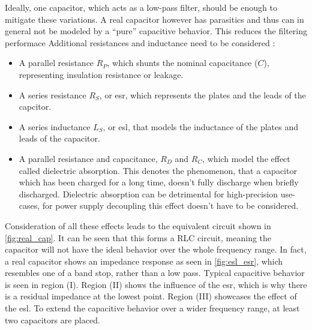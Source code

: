 Ideally, one capacitor, which acts as a low-pass filter, should be enough to mitigate these variations.
A real capacitor however has parasitics and thus can in general not be modeled by a ``pure'' capacitive behavior. This reduces the filtering performace  %
Additional resistances and inductance need to be considered \cite{decouple}:
\begin{itemize}
	\item A parallel resistance $R_P$, which shunts the nominal capacitance ($C$), representing insulation resistance or leakage.
	\item A series resistance $R_S$, or \gls{esr}, which represents the plates and the leads of the capcitor.
	\item A series inductance $L_S$, or \gls{esl}, that models the inductance of the plates and leads of the capacitor.
	\item A parallel resistance and capacitance, $R_D$ and $R_C$, which model the effect called dielectric absorption. This denotes the phenomenon, that a capacitor which has been charged for a long time, doesn't fully discharge when briefly discharged. Dielectric absorption can be detrimental for high-precision use-cases, for power supply decoupling this effect doesn't have to be considered.
\end{itemize}
Consideration of all these effects leads to the equivalent circuit shown in \autoref{fig:real_cap}.
It can be seen that this forms a RLC circuit, meaning the capacitor will not have the ideal behavior over the whole frequency range. 
In fact, a real capacitor shows an impedance response as seen in \autoref{fig:esl_esr}, which resembles one of a band stop, rather than a low pass.
Typical capacitive behavior is seen in region (I).
Region (II) shows the influence of the \gls{esr}, which is why there is a residual impedance at the lowest point.
Region (III) showcases the effect of the \gls{esl}. 
To extend the capacitive behavior over a wider frequency range, at least two capacitors are placed.


